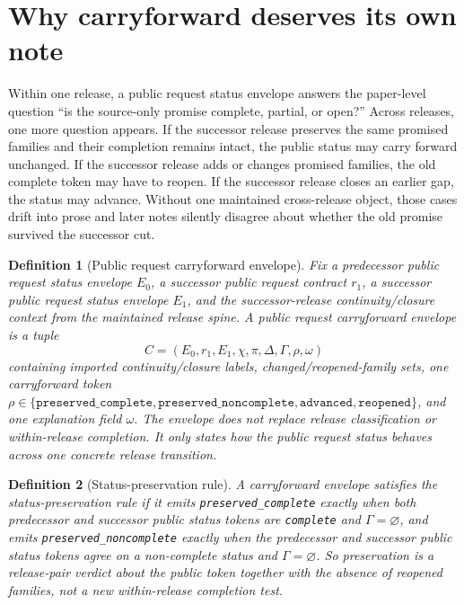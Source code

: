 \documentclass[11pt]{article}
\newtheorem{definition}{Definition}
\begin{document}
\section{Why carryforward deserves its own note}
Within one release, a public request status envelope answers the paper-level question ``is the source-only promise complete, partial, or open?''
Across releases, one more question appears.
If the successor release preserves the same promised families and their completion remains intact, the public status may carry forward unchanged.
If the successor release adds or changes promised families, the old complete token may have to reopen.
If the successor release closes an earlier gap, the status may advance.
Without one maintained cross-release object, those cases drift into prose and later notes silently disagree about whether the old promise survived the successor cut.

\begin{definition}[Public request carryforward envelope]
Fix a predecessor public request status envelope $E_0$, a successor public request contract $r_1$, a successor public request status envelope $E_1$, and the successor-release continuity/closure context from the maintained release spine.
A \emph{public request carryforward envelope} is a tuple
\[
C=(E_0,r_1,E_1,\chi,\pi,\Delta,\Gamma,\rho,\omega)
\]
containing imported continuity/closure labels, changed/reopened-family sets, one carryforward token $\rho\in\{\texttt{preserved\_complete},\texttt{preserved\_noncomplete},\texttt{advanced},\texttt{reopened}\}$, and one explanation field $\omega$.
The envelope does not replace release classification or within-release completion.
It only states how the public request status behaves across one concrete release transition.
\end{definition}

\begin{definition}[Status-preservation rule]
A carryforward envelope satisfies the \emph{status-preservation rule} if it emits \texttt{preserved\_complete} exactly when both predecessor and successor public status tokens are \texttt{complete} and $\Gamma=\varnothing$, and emits \texttt{preserved\_noncomplete} exactly when the predecessor and successor public status tokens agree on a non-complete status and $\Gamma=\varnothing$.
So preservation is a release-pair verdict about the public token together with the absence of reopened families, not a new within-release completion test.
\end{definition}
\end{document}
